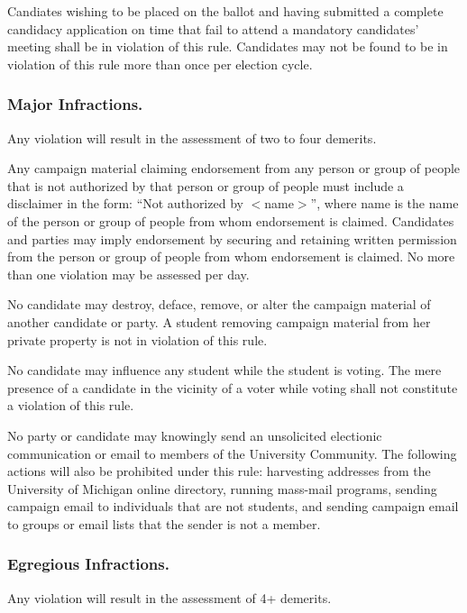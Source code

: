 Candiates  wishing to be placed on the ballot and having submitted a complete candidacy application on time that fail to attend a mandatory candidates' meeting shall be in violation of this rule. Candidates may not be found to be in violation of this rule more than once per election cycle.


\subsubsection{Major Infractions.}
Any violation will result in the assessment of two to four demerits.

Any campaign material claiming endorsement from any person or group of people that is not authorized by that person or group of people must include a disclaimer in the form: ``Not authorized by $<$name$>$'', where name is the name of the person or group of people from whom endorsement is claimed.  Candidates and parties may imply endorsement by securing and retaining written permission from the person or group of people from whom endorsement is claimed. No more than one violation may be assessed per day.

No candidate may destroy, deface, remove, or alter the campaign material of another candidate or party. A student removing campaign material from her private property is not in violation of this rule.

No candidate may influence any student while the student is voting. The mere presence of a candidate in the vicinity of a voter while voting shall not constitute a violation of this rule. 

No party or candidate may knowingly send an unsolicited electionic communication or email to members of the University Community. The following actions will also be prohibited under this rule: harvesting addresses from the University of Michigan online directory, running mass-mail programs, sending campaign email to individuals that are not students, and sending campaign email to groups or email lists that the sender is not a member.


\subsubsection{Egregious Infractions.}
Any violation will result in the assessment of 4+ demerits.

